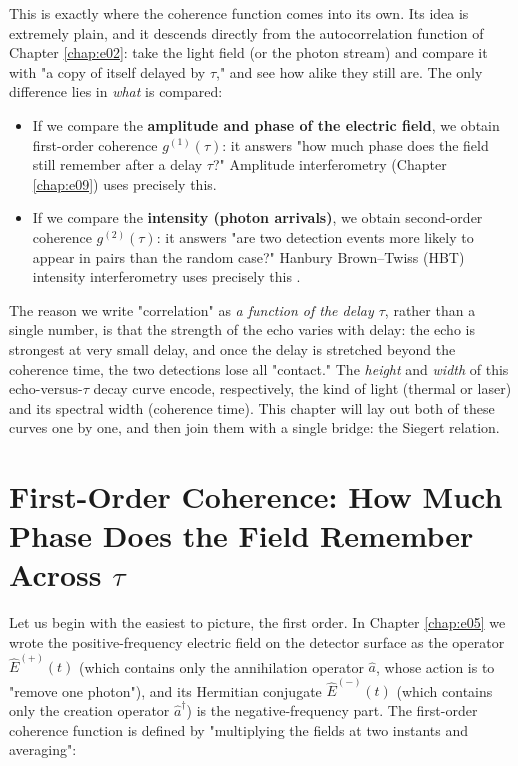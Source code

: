 This is exactly where the coherence function comes into its own. Its idea is extremely plain, and it descends directly from the autocorrelation function of Chapter \ref{chap:e02}: take the light field (or the photon stream) and compare it with "a copy of itself delayed by \(\tau\)," and see how alike they still are. The only difference lies in \emph{what} is compared:

\begin{itemize}
  \item If we compare the \textbf{amplitude and phase of the electric field}, we obtain first-order coherence \(g^{(1)}(\tau)\): it answers "how much phase does the field still remember after a delay \(\tau\)?" Amplitude interferometry (Chapter \ref{chap:e09}) uses precisely this.
  \item If we compare the \textbf{intensity (photon arrivals)}, we obtain second-order coherence \(g^{(2)}(\tau)\): it answers "are two detection events more likely to appear in pairs than the random case?" Hanbury Brown--Twiss (HBT) intensity interferometry uses precisely this \citep{1956Natur.177...27B}.
\end{itemize}

The reason we write "correlation" as \emph{a function of the delay \(\tau\)}, rather than a single number, is that the strength of the echo varies with delay: the echo is strongest at very small delay, and once the delay is stretched beyond the coherence time, the two detections lose all "contact." The \emph{height} and \emph{width} of this echo-versus-\(\tau\) decay curve encode, respectively, the kind of light (thermal or laser) and its spectral width (coherence time). This chapter will lay out both of these curves one by one, and then join them with a single bridge: the Siegert relation.

\section{First-Order Coherence: How Much Phase Does the Field Remember Across \texorpdfstring{$\tau$}{tau}}
\label{sec:e08-g1}

Let us begin with the easiest to picture, the first order. In Chapter \ref{chap:e05} we wrote the positive-frequency electric field on the detector surface as the operator \(\hat E^{(+)}(t)\) (which contains only the annihilation operator \(\hat a\), whose action is to "remove one photon"), and its Hermitian conjugate \(\hat E^{(-)}(t)\) (which contains only the creation operator \(\hat a^\dagger\)) is the negative-frequency part. The first-order coherence function is defined by "multiplying the fields at two instants and averaging":

